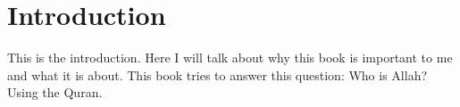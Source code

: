 \chapter{Introduction}
This is the introduction. Here I will talk about why this book is important to me and what it is about.
This book tries to answer this question: Who is Allah? Using the Quran.
